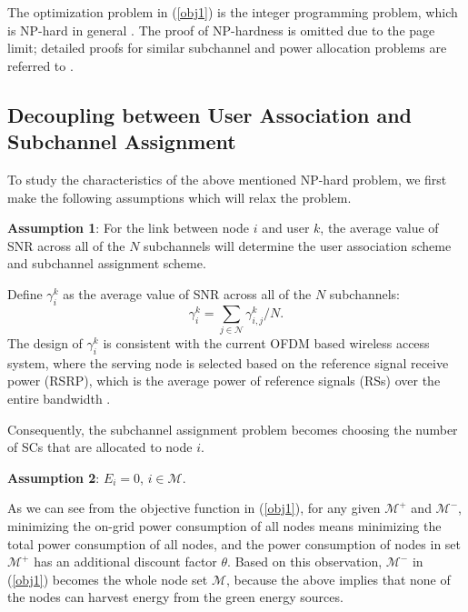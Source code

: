 \documentclass[journal,12pt,onecolumn]{IEEEtran}
\begin{document}
The optimization problem in (\ref{obj1}) is the integer programming problem, which is NP-hard in general \cite{Papadimitriou:1981:CIP:322276.322287}. The proof of NP-hardness is omitted due to the page limit; detailed proofs for similar subchannel and power allocation problems are referred to \cite{5506244,6336839,6884803}.
\subsection{Decoupling between User Association and Subchannel Assignment}\label{assump}
To study the characteristics of the above mentioned NP-hard problem, we first make the following assumptions which will relax the problem.

{\bf{Assumption 1}}: For the link between node $i$ and user $k$, the average value of SNR across all of the $N$ subchannels will determine the user association scheme and subchannel assignment scheme.

Define $\gamma_{i}^k$ as the average value of SNR across all of the $N$ subchannels:\begin{equation}
\gamma_{i}^k={\sum\limits_{j\in\mathcal{N}}\gamma_{i,j}^k}/{N}.
\end{equation}
The design of $\gamma_{i}^k$ is consistent with the current OFDM based wireless access system, where the serving node is selected based on the reference signal receive power (RSRP), which is the average power of reference signals (RSs) over the entire bandwidth \cite{1244793}. 

Consequently, the subchannel assignment problem becomes choosing the number of SCs that are allocated to node $i$.


{\bf{Assumption 2}}: $E_i=0$, $i\in\mathcal{M}$.

As we can see from the objective function in (\ref{obj1}), for any given $\mathcal{M}^+$ and $\mathcal{M}^-$, minimizing the on-grid power consumption of all nodes means minimizing the total power consumption of all nodes, and the power consumption of nodes in set $\mathcal{M}^+$ has an additional discount factor $\theta$. Based on this observation, $\mathcal{M}^-$ in (\ref{obj1}) becomes the whole node set $\mathcal{M}$, because the above implies that none of the nodes can harvest energy from the green energy sources.
\end{document}
